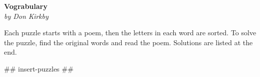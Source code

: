 \documentclass[letterpaper,10pt]{extarticle}
\begin{document}
\newcommand{\puzzlesize}[1]{{\fontsize{36pt}{0.1em}\selectfont #1}}
\newcommand{\hdash}{\puzzlesize{\_}}
\newcommand{\hspacer}{\puzzlesize{\phantom{\_}}}
   \begin{center}
      \Large\textbf{Vograbulary}\\
      \large\textit{by Don Kirkby}
   \end{center}
{\fontsize{3mm}{0.1em}\selectfont
Each puzzle starts with a poem, then the letters in each word are sorted. To
solve the puzzle, find the original words and read the poem. Solutions are
listed at the end.
}

## insert-puzzles ##
\end{document}
